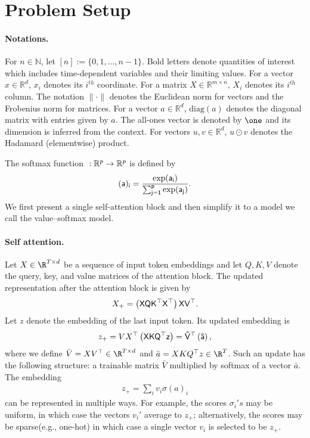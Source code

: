 \documentclass{article}
\theoremstyle{plain}
\theoremstyle{definition}
\theoremstyle{remark}
\begin{document}
\section{Problem Setup}

\paragraph{Notations.} For $n \in \mathbb{N}$, let $[n] := \{0,1,\ldots,n{-}1\}$. Bold letters denote quantities of interest which includes time-dependent variables and their limiting values. For a vector $x \in \mathbb{R}^d$, $x_i$ denotes its $i^{th}$ coordinate. For a matrix $X \in \mathbb{R}^{m \times n}$, $X_i$ denotes its $i^{th}$ column. The notation $\|\cdot\|$ denotes the Euclidean norm for vectors and the Frobenius norm for matrices. For a vector $a \in \mathbb{R}^d$, $\mathrm{diag}(a)$ denotes the diagonal matrix with entries given by $a$. The all-ones vector is denoted by $\one$ and its dimension is inferred from the context. For vectors $u, v \in \mathbb{R}^d$, $u \odot v$ denotes the Hadamard (elementwise) product. 

The softmax function $\mathrm{\sf} : \mathbb{R}^p \to \mathbb{R}^p$ is defined by
\begin{align*}
  \sf(a)_i = \frac{\exp(a_i)}{\sum_{j=1}^{p} \exp(a_j)}.  
\end{align*}
We first present a single self-attention block and then simplify it to a model we call the value–softmax model.

\paragraph{Self attention.} 
%
Let $X \in \R^{T \times d}$ be a sequence of input token embeddings and let $Q,K,V$ denote the query, key, and value matrices of the attention block. The updated representation after the attention block is given by 
\begin{align*}
  X_{+} = \sf\left( X QK^{\top} X^{\top} \right) X V^{\top}. 
\end{align*}
Let $z$ denote the embedding of the last input token. Its updated embedding is 
\begin{align*}
  z_{+}  = V X^{\top} \sf\left( X K Q^{\top} z\right) = \bar{V}^{\top} \sf\left( \bar{a} \right),
\end{align*}
where we define $\bar{V} = XV^{\top} \in \R^{T \times d}$ and $\bar{a} = X K Q^{\top} z \in \R^{T}$. 
Such an update has the following structure: a trainable matrix $\bar{V}$ multiplied by softmax of a vector $\bar{a}$. The embedding 
\begin{align*}
z_{+} = \sum_{i} v_i \sigma(a)_i 
\end{align*}
can be represented in multiple ways. For example, the scores $\sigma_{i}'s$ may be uniform, in which case the vectors  $v_i'$ average to $z_{+}$; alternatively, the scores may be sparse(e.g., one-hot) in which case a single vector $v_i$ is selected to be $z_{+}$. 
\end{document}
